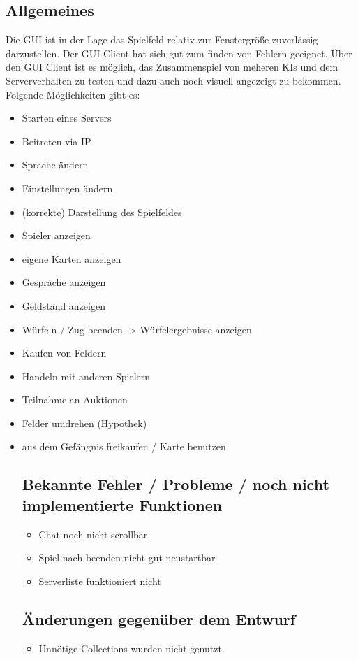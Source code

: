 \documentclass[a4paper,10pt]{article}
\begin{document}
\subsection{Allgemeines}
Die GUI ist in der Lage das Spielfeld relativ zur Fenstergröße zuverlässig darzustellen.
Der GUI Client hat sich gut zum finden von Fehlern geeignet. Über den GUI Client ist es möglich, das Zusammenspiel von meheren KIs und dem Serververhalten zu testen und dazu auch noch visuell angezeigt zu bekommen.
Folgende Möglichkeiten gibt es:
\begin{itemize}
\item Starten eines Servers
\item Beitreten via IP
\item Sprache ändern
\item Einstellungen ändern
\item (korrekte) Darstellung des Spielfeldes
\item Spieler anzeigen
\item eigene Karten anzeigen
\item Gespräche anzeigen
\item Geldstand anzeigen
\item Würfeln / Zug beenden -> Würfelergebnisse anzeigen
\item Kaufen von Feldern
\item Handeln mit anderen Spielern
\item Teilnahme an Auktionen
\item Felder umdrehen (Hypothek)
\item aus dem Gefängnis freikaufen / Karte benutzen
\subsection{Bekannte Fehler / Probleme / noch nicht implementierte Funktionen}
\begin{itemize}
\item Chat noch nicht scrollbar
\item Spiel nach beenden nicht gut neustartbar
\item Serverliste funktioniert nicht
\end{itemize}
\subsection{Änderungen gegenüber dem Entwurf}
\begin{itemize}
\item Unnötige Collections wurden nicht genutzt.
\end{itemize}


\end{itemize}
\end{document}
